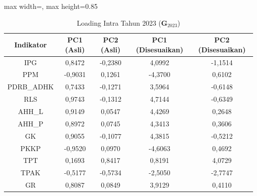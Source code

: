 \begin{table}[H]
\centering
\caption{Loading Intra Tahun 2023 ($\mathbf{G}_{2023}$)} \label{tab:app2loading_intra_2023}
\begin{adjustbox}{max width=\textwidth, max height=0.85\textheight}
\begin{tabular}{|c|c|c|c|c|}
\hline
\textbf{Indikator} & \textbf{PC1 (Asli)} & \textbf{PC2 (Asli)} & \textbf{PC1 (Disesuaikan)} & \textbf{PC2 (Disesuaikan)} \\
\hline
IPG & 0,8472 & -0,2380 & 4,0992 & -1,1514 \\
PPM & -0,9031 & 0,1261 & -4,3700 & 0,6102 \\
PDRB\_ADHK & 0,7433 & -0,1271 & 3,5964 & -0,6148 \\
RLS & 0,9743 & -0,1312 & 4,7144 & -0,6349 \\
AHH\_L & 0,9149 & 0,0547 & 4,4269 & 0,2648 \\
AHH\_P & 0,8972 & 0,0745 & 4,3413 & 0,3606 \\
GK & 0,9055 & -0,1077 & 4,3815 & -0,5212 \\
PKKP & -0,9520 & 0,0970 & -4,6063 & 0,4692 \\
TPT & 0,1693 & 0,8417 & 0,8191 & 4,0729 \\
TPAK & -0,5177 & -0,5734 & -2,5050 & -2,7747 \\
GR & 0,8087 & 0,0849 & 3,9129 & 0,4110 \\
\hline
\end{tabular}
\end{adjustbox}
\end{table}